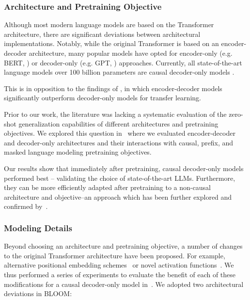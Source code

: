 \subsubsection{Architecture and Pretraining Objective}

Although most modern language models are based on the Transformer architecture, there are significant deviations between architectural implementations. Notably, while the original Transformer is based on an encoder-decoder architecture, many popular models have opted for encoder-only (e.g. BERT, \citep{devlin2019bert}) or decoder-only (e.g. GPT, \citep{radford2018improving}) approaches. Currently, all state-of-the-art language models over 100 billion parameters are causal decoder-only models \citep{brown2020language, rae2021scaling, chowdhery2022palm}. 

This is in opposition to the findings of \citet{raffel2020exploring}, in which encoder-decoder models significantly outperform decoder-only models for transfer learning.

Prior to our work, the literature was lacking a systematic evaluation of the zero-shot generalization capabilities of different architectures and pretraining objectives. We explored this question in~\citet{wang2022what} where we evaluated encoder-decoder and decoder-only architectures and their interactions with causal, prefix, and masked language modeling pretraining objectives. 

Our results show that immediately after pretraining, causal decoder-only models performed best -- validating the choice of state-of-the-art LLMs. Furthermore, they can be more efficiently adapted after pretraining to a non-causal architecture and objective--an approach which has been further explored and confirmed by~\citet{tay2022transcending}.

\subsubsection{Modeling Details}

Beyond choosing an architecture and pretraining objective, a number of changes to the original Transformer architecture have been proposed. For example, alternative positional embedding schemes~\citep{su2021roformer, press2021train} or novel activation functions~\citep{shazeer2020glu}. We thus performed a series of experiments to evaluate the benefit of each of these modifications for a causal decoder-only model in~\citet{scao2022what}. We adopted two architectural deviations in BLOOM:

